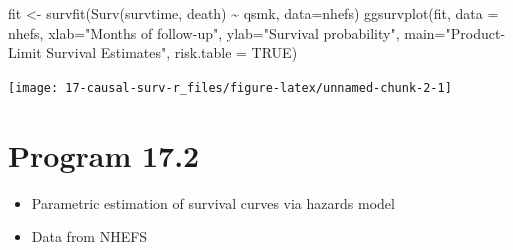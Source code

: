 \documentclass[
  10pt,
  a4paper,
]{book}
\newenvironment{Shaded}{\begin{snugshade}}{\end{snugshade}}
\newcommand{\AttributeTok}[1]{\textcolor[rgb]{0.40,0.45,0.13}{#1}}
\newcommand{\ConstantTok}[1]{\textcolor[rgb]{0.56,0.35,0.01}{#1}}
\newcommand{\FunctionTok}[1]{\textcolor[rgb]{0.28,0.35,0.67}{#1}}
\newcommand{\NormalTok}[1]{\textcolor[rgb]{0.00,0.46,0.62}{#1}}
\newcommand{\OtherTok}[1]{\textcolor[rgb]{0.00,0.46,0.62}{#1}}
\newcommand{\SpecialCharTok}[1]{\textcolor[rgb]{0.37,0.37,0.37}{#1}}
\newcommand{\StringTok}[1]{\textcolor[rgb]{0.13,0.47,0.30}{#1}}
\providecommand{\tightlist}{%
  \setlength{\itemsep}{0pt}\setlength{\parskip}{0pt}}
\begin{document}
\begin{Shaded}
\begin{Highlighting}[]
\NormalTok{fit }\OtherTok{\textless{}{-}} \FunctionTok{survfit}\NormalTok{(}\FunctionTok{Surv}\NormalTok{(survtime, death) }\SpecialCharTok{\textasciitilde{}}\NormalTok{ qsmk, }\AttributeTok{data=}\NormalTok{nhefs)}
\FunctionTok{ggsurvplot}\NormalTok{(fit, }\AttributeTok{data =}\NormalTok{ nhefs, }\AttributeTok{xlab=}\StringTok{"Months of follow{-}up"}\NormalTok{,}
           \AttributeTok{ylab=}\StringTok{"Survival probability"}\NormalTok{,}
           \AttributeTok{main=}\StringTok{"Product{-}Limit Survival Estimates"}\NormalTok{, }\AttributeTok{risk.table =} \ConstantTok{TRUE}\NormalTok{)}
\end{Highlighting}
\end{Shaded}

\begin{center}\texttt{[image: 17-causal-surv-r\_files/figure-latex/unnamed-chunk-2-1]} \end{center}

\hypertarget{program-17.2}{%
\section{Program 17.2}\label{program-17.2}}

\begin{itemize}
\tightlist
\item
  Parametric estimation of survival curves via hazards model
\item
  Data from NHEFS
\end{itemize}
\end{document}
